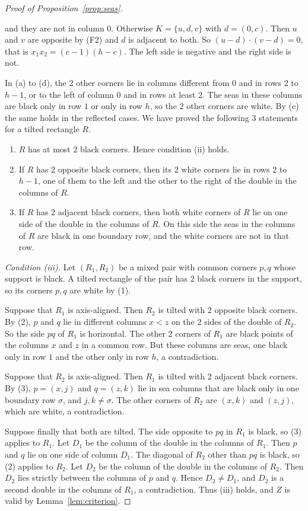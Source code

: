 \begin{proof}[Proof of Proposition~\ref{prop:seas}]
\begin{enumerate}[(a)]
and they are not in column $0$. Otherwise $K=\{u,d,v\}$ with $d=(0,c)$. Then $u$ and $v$
are opposite by (F2) and $d$ is adjacent to both. So $(u-d)\cdot(v-d)=0$, that is
$x_1x_2=(c-1)(h-c)$. The left side is negative and the right side is not.
\end{enumerate}
In (a) to (d), the 2 other corners lie in columns different from $0$ and in rows $2$ to
$h-1$, or to the left of column $0$ and in rows at least $2$. The seas in these columns are
black only in row $1$ or only in row $h$, so the 2 other corners are white. By (e) the same
holds in the reflected cases. We have proved the following 3 statements for a tilted
rectangle $R$.
\begin{enumerate}[(1)]
\item $R$ has at most 2 black corners. Hence condition (ii) holds.
\item If $R$ has 2 opposite black corners, then its 2 white corners lie in rows $2$ to $h-1$,
one of them to the left and the other to the right of the double in the columns of $R$.
\item If $R$ has 2 adjacent black corners, then both white corners of $R$ lie on one side
of the double in the columns of $R$. On this side the seas in the columns of $R$ are black
in one boundary row, and the white corners are not in that row.
\end{enumerate}

\emph{Condition (iii).} Let $(R_1,R_2)$ be a mixed pair with common corners $p,q$ whose
support is black. A tilted rectangle of the pair has 2 black corners in the support, so its
corners $p,q$ are white by (1).

Suppose that $R_1$ is axis-aligned. Then $R_2$ is tilted with 2 opposite black corners. By
(2), $p$ and $q$ lie in different columns $x<z$ on the 2 sides of the double of $R_2$. So
the side $pq$ of $R_1$ is horizontal. The other 2 corners of $R_1$ are black points of the
columns $x$ and $z$ in a common row. But these columns are seas, one black only in row $1$
and the other only in row $h$, a contradiction.

Suppose that $R_2$ is axis-aligned. Then $R_1$ is tilted with 2 adjacent black corners. By
(3), $p=(x,j)$ and $q=(z,k)$ lie in sea columns that are black only in one boundary row
$\sigma$, and $j,k\ne\sigma$. The other corners of $R_2$ are $(x,k)$ and $(z,j)$, which are
white, a contradiction.

Suppose finally that both are tilted. The side opposite to $pq$ in $R_1$ is black, so (3)
applies to $R_1$. Let $D_1$ be the column of the double in the columns of $R_1$. Then $p$
and $q$ lie on one side of column $D_1$. The diagonal of $R_2$ other than $pq$ is black, so
(2) applies to $R_2$. Let $D_2$ be the column of the double in the columns of $R_2$. Then
$D_2$ lies strictly between the columns of $p$ and $q$. Hence $D_2\ne D_1$, and $D_2$ is a
second double in the columns of $R_1$, a contradiction. Thus (iii) holds, and $Z$ is valid by
Lemma~\ref{lem:criterion}.
\end{proof}

